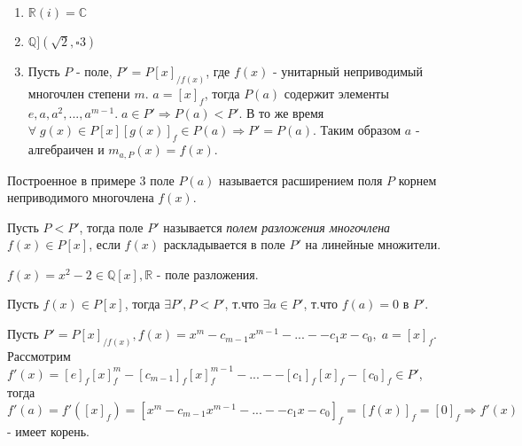 \begin{example}
  \begin{enumerate}
    \item $\mathbb{R}(i) = \mathbb{C}$
    \item $\mathbb{Q}](\sqrt{2}, \square{3})$
    \item Пусть $P$ - поле, $P' = P[x]_{/f(x)}$, где $f(x)$ - унитарный неприводимый многочлен степени $m$.
    $a = [x]_{f}$, тогда $P(a)$ содержит элементы $e,a,a^2,...,a^{m-1}. \; a \in P' \Rightarrow P(a) < P'.$ В то же время $\forall\; g(x) \in P[x] [g(x)]_{f} \in P(a) \Rightarrow P' = P(a).$
    Таким образом $a$ - алгебраичен и $m_{a,P}(x) = f(x)$.
  \end{enumerate}
\end{example}

\begin{defs}
  Построенное в примере 3 поле $P(a)$ называется расширением поля $P$ корнем неприводимого многочлена $f(x)$.
\end{defs}

\begin{defs}
  Пусть $P < P'$, тогда поле $P'$ называется \textit{полем разложения многочлена $f(x) \in P[x]$}, если $f(x)$ раскладывается в поле
  $P'$ на линейные множители.
\end{defs}

\begin{example}
  $f(x) = x^2 - 2 \in \mathbb{Q}[x], \mathbb{R}$ - поле разложения.
\end{example}


\begin{proofs}
	Пусть $f(x) \in P[x]$, тогда $\exists P', P < P'$, т.что $\exists a \in P'$, т.что $f(a) = 0$ в $P'$.
  \begin{dokvo}
    Пусть $P' = P[x]_{/f(x)}, f(x) = x^m - c_{m-1}x^{m-1} - ... - - c_1x - c_0,\;a = [x]_{f}$. 
    Рассмотрим $f'(x) = [e]_f[x]_f^m - [c_{m-1}]_f[x]_f^{m-1} - ... - - [c_1]_f[x]_f - [c_0]_f \in P'$, тогда
    $f'(a) = f'([x]_f) = [x^m - c_{m-1}x^{m-1} - ... - - c_1x - c_0]_f = [f(x)]_f = [0]_f \Rightarrow f'(x)$ - имеет корень. 
	\end{dokvo}
\end{proofs}

